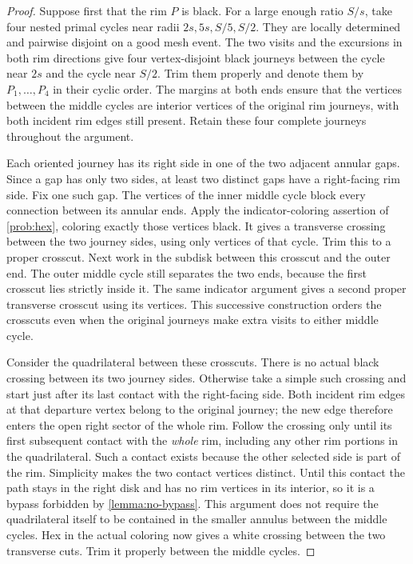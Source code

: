 \begin{proof}
Suppose first that the rim $P$ is black.  For a large enough ratio $S/s$,
take four nested primal cycles near radii
$2s,5s,S/5,S/2$.  They are locally determined and pairwise disjoint on
a good mesh event.  The two visits and the excursions in both rim
directions give four vertex-disjoint black journeys between the cycle near
$2s$ and the cycle near $S/2$.  Trim them properly and denote them by
$P_1,\ldots,P_4$ in their cyclic order.  The margins at both ends ensure
that the vertices between the middle cycles are interior vertices of
the original rim journeys, with both incident rim edges still present.
Retain these four complete journeys throughout the argument.

Each oriented journey has its right side in one of the two adjacent
annular gaps.  Since a gap has only two sides, at least two distinct gaps
have a right-facing rim side.  Fix one such gap.  The vertices of the
inner middle cycle block every connection between its annular ends.
Apply the indicator-coloring assertion of \cref{prob:hex}, coloring
exactly those vertices black.  It gives a transverse crossing between
the two journey sides, using only vertices of that cycle.  Trim this to
a proper crosscut.  Next work in the subdisk between this crosscut and
the outer end.  The outer middle cycle still separates the two ends,
because the first crosscut lies strictly inside it.  The same indicator
argument gives a second proper transverse crosscut using its vertices.
This successive construction orders the crosscuts even when the
original journeys make extra visits to either middle cycle.

Consider the quadrilateral between these crosscuts.  There is no actual
black crossing between its two journey sides.  Otherwise take a simple
such crossing and start just after its last contact with the right-facing
side.  Both incident rim edges at that departure vertex belong to the
original journey; the new edge therefore enters the open right sector of
the whole rim.  Follow the crossing only until its first subsequent
contact with the \emph{whole} rim, including any other rim portions in
the quadrilateral.  Such a contact exists because the other selected
side is part of the rim.  Simplicity makes the two contact vertices
distinct.  Until this contact the path stays in the right disk and has
no rim vertices in its interior, so it is a bypass forbidden by
\cref{lemma:no-bypass}.  This argument does not require the quadrilateral
itself to be contained in the smaller annulus between the middle cycles.
Hex in the actual coloring now gives a white crossing between the two
transverse cuts.  Trim it properly between the middle cycles.


\end{proof}
